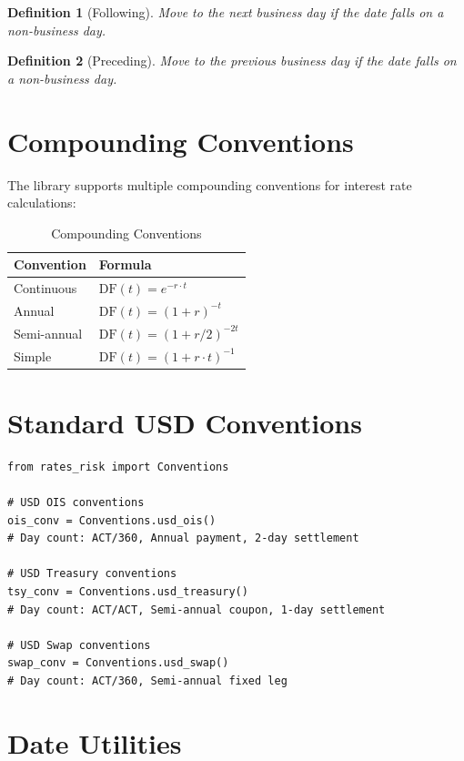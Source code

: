\documentclass[12pt,a4paper]{report}
\newtheorem{definition}{Definition}[chapter]
\newcommand{\df}{\text{DF}}
\begin{document}
\begin{definition}[Following]
Move to the next business day if the date falls on a non-business day.
\end{definition}

\begin{definition}[Preceding]
Move to the previous business day if the date falls on a non-business day.
\end{definition}

\section{Compounding Conventions}

The library supports multiple compounding conventions for interest rate calculations:

\begin{table}[H]
\centering
\begin{tabular}{@{}ll@{}}
\toprule
\textbf{Convention} & \textbf{Formula} \\
\midrule
Continuous & $\df(t) = e^{-r \cdot t}$ \\
Annual & $\df(t) = (1 + r)^{-t}$ \\
Semi-annual & $\df(t) = (1 + r/2)^{-2t}$ \\
Simple & $\df(t) = (1 + r \cdot t)^{-1}$ \\
\bottomrule
\end{tabular}
\caption{Compounding Conventions}
\end{table}

\section{Standard USD Conventions}

\begin{lstlisting}
from rates_risk import Conventions

# USD OIS conventions
ois_conv = Conventions.usd_ois()
# Day count: ACT/360, Annual payment, 2-day settlement

# USD Treasury conventions  
tsy_conv = Conventions.usd_treasury()
# Day count: ACT/ACT, Semi-annual coupon, 1-day settlement

# USD Swap conventions
swap_conv = Conventions.usd_swap()
# Day count: ACT/360, Semi-annual fixed leg
\end{lstlisting}

\section{Date Utilities}
\end{document}
